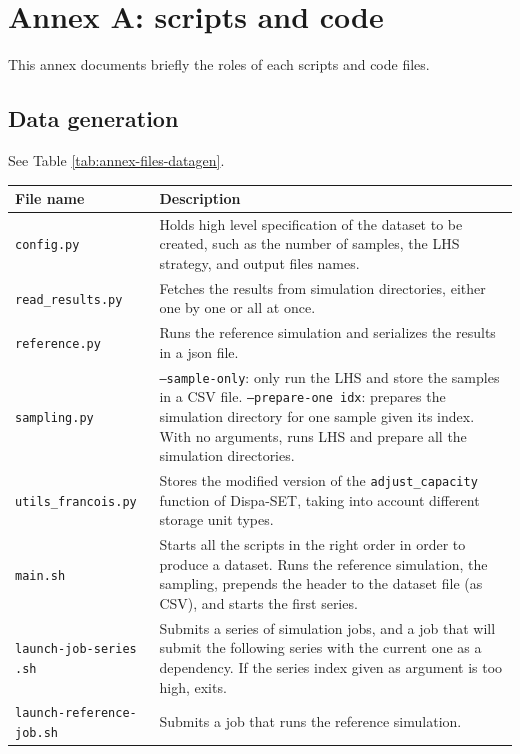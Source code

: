 \addtocounter{section}{1}
\section{Annex A: scripts and code}

This annex documents briefly the roles of each scripts and code files.

\subsection{Data generation}

See Table \ref{tab:annex-files-datagen}.

\begin{table}[h]
    \centering
    \begin{tabular}{|p{}|p{}|}
        \hline
        File name & Description \\ \hline
        \texttt{config.py} & Holds high level specification of the dataset to be created, such as the number of samples, the LHS strategy, and output files names. \\
        \texttt{read\_results.py} & Fetches the results from simulation directories, either one by one or all at once. \\
        \texttt{reference.py} & Runs the reference simulation and serializes the results in a json file. \\
        \texttt{sampling.py} & \texttt{--sample-only}: only run the LHS and store the samples in a CSV file. \texttt{--prepare-one idx}: prepares the simulation directory for one sample given its index. With no arguments, runs LHS and prepare all the simulation directories. \\
        \texttt{utils\_francois.py} & Stores the modified version of the \texttt{adjust\_capacity} function of Dispa-SET, taking into account different storage unit types. \\ \hline
        \texttt{main.sh} & Starts all the scripts in the right order in order to produce a dataset. Runs the reference simulation, the sampling, prepends the header to the dataset file (as CSV), and starts the first series. \\
        \texttt{launch-job-series} \texttt{.sh} & Submits a series of simulation jobs, and a job that will submit the following series with the current one as a dependency. If the series index given as argument is too high, exits. \\
        \texttt{launch-reference-} \texttt{job.sh} & Submits a job that runs the reference simulation. \\

\end{tabular}
\end{table}
